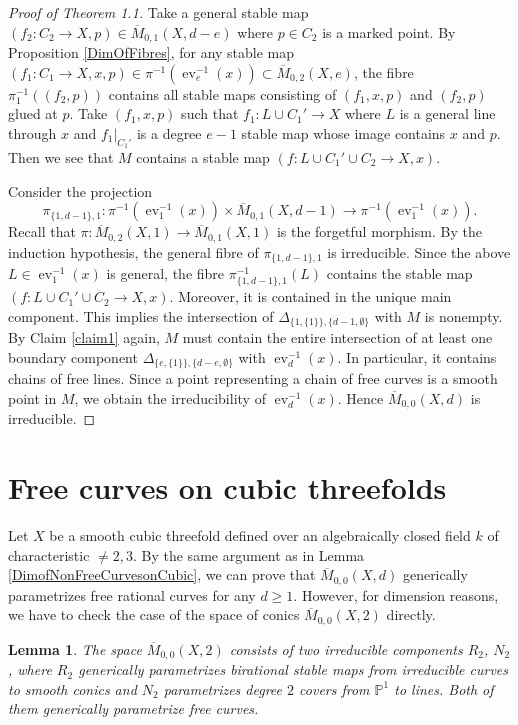 \documentclass[dvipdfmx, 12pt, a4paper]{amsart}
\theoremstyle{plain}
\newtheorem{lem}[thm]{Lemma}
\theoremstyle{definition}
\theoremstyle{remark}
\newcommand{\ra}{\rightarrow}
\newcommand{\bP}{\mathbb{P}}
\DeclareMathOperator{\ev}{ev}
\newcommand{\ol}{\overline}
\begin{document}
\begin{proof}[Proof of Theorem 1.1]
		Take a general stable map $(f_2:C_2\ra X,p)\in\ol{M}_{0,1}(X,d-e)$ where $p\in C_2$ is a marked point. By Proposition \ref{DimOfFibres}, for any stable map $(f_1:C_1\ra X,x,p)\in\pi^{-1}(\ev_e^{-1}(x))\subset\ol{M}_{0,2}(X,e)$, the fibre $\pi_1^{-1}((f_2,p))$ contains all stable maps consisting of $(f_1,x,p)$ and $(f_2,p)$ glued at $p$. Take $(f_1,x,p)$ such that $f_1:L\cup C_1'\ra X$ where $L$ is a general line through $x$ and $f_1|_{C_1'}$ is a degree $e-1$ stable map whose image contains $x$ and $p$. Then we see that $M$ contains a stable map $(f:L\cup C_1'\cup C_2\ra X,x)$.
		
		Consider the projection
		$$\pi_{\{1,d-1\},1}:\pi^{-1}(\ev_1^{-1}(x))\times\ol{M}_{0,1}(X,d-1)\ra\pi^{-1}(\ev_1^{-1}(x)).$$
		Recall that $\pi:\ol{M}_{0,2}(X,1)\ra\ol{M}_{0,1}(X,1)$ is the forgetful morphism. By the induction hypothesis, the general fibre of $\pi_{\{1,d-1\},1}$ is irreducible. Since the above $L\in\ev_1^{-1}(x)$ is general, the fibre $\pi_{\{1,d-1\},1}^{-1}(L)$ contains the stable map $(f:L\cup C_1'\cup C_2\ra X,x)$. Moreover, it is contained in the unique main component. This implies the intersection of $\Delta_{\{1,\{1\}\},\{d-1,\emptyset\}}$ with $M$ is nonempty. By Claim \ref{claim1} again, $M$ must contain the entire intersection of at least one boundary component $	\Delta_{\{e,\{1\}\},\{d-e,\emptyset\}}$ with $\ev_d^{-1}(x)$. In particular, it contains chains of free lines. Since a point representing a chain of free curves is a smooth point in $M$, we obtain the irreducibility of $\ev_d^{-1}(x)$. Hence $\ol{M}_{0,0}(X,d)$ is irreducible.
	\end{proof}



\section{Free curves on cubic threefolds}

	Let $X$ be a smooth cubic threefold defined over an algebraically closed field $k$ of characteristic $\neq2,3$. By the same argument as in Lemma \ref{DimofNonFreeCurvesonCubic}, we can prove that $\ol{M}_{0,0}(X,d)$ generically parametrizes free rational curves for any $d\geq1$. However, for dimension reasons, we have to check the case of the space of conics $\ol{M}_{0,0}(X,2)$ directly.
	
	
	\begin{lem}\label{Conics}
		The space $\ol{M}_{0,0}(X,2)$ consists of two irreducible components $R_2$, $N_2$, where $R_2$ generically parametrizes birational stable maps from irreducible curves to smooth conics and $N_2$ parametrizes degree $2$ covers from $\bP^1$ to lines. Both of them generically parametrize free curves.
	\end{lem}
	
\end{document}
